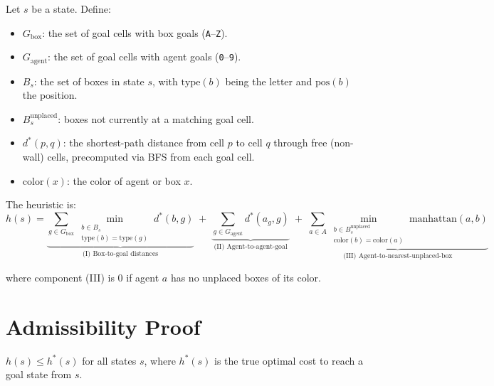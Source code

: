 \documentclass[11pt, a4paper]{article}
\begin{document}
\begin{definitionbox}
Let $s$ be a state. Define:
\begin{itemize}[leftmargin=1.5em]
    \item $G_{\text{box}}$: the set of goal cells with box goals (\texttt{A}--\texttt{Z}).
    \item $G_{\text{agent}}$: the set of goal cells with agent goals (\texttt{0}--\texttt{9}).
    \item $B_s$: the set of boxes in state $s$, with $\text{type}(b)$ being the letter and $\text{pos}(b)$ the position.
    \item $B_s^{\text{unplaced}}$: boxes not currently at a matching goal cell.
    \item $d^*(p, q)$: the shortest-path distance from cell $p$ to cell $q$ through free (non-wall) cells, precomputed via BFS from each goal cell.
    \item $\text{color}(x)$: the color of agent or box $x$.
\end{itemize}

\vspace{0.5em}
The heuristic is:
\[
\boxed{
    h(s) = \underbrace{\sum_{g \in G_{\text{box}}} \min_{\substack{b \in B_s \\ \text{type}(b) = \text{type}(g)}} d^*(b, g)}_{\text{(I) Box-to-goal distances}}
    \;+\; \underbrace{\sum_{g \in G_{\text{agent}}} d^*(a_g, g)}_{\text{(II) Agent-to-agent-goal}}
    \;+\; \underbrace{\sum_{a \in A} \min_{\substack{b \in B_s^{\text{unplaced}} \\ \text{color}(b) = \text{color}(a)}} \text{manhattan}(a, b)}_{\text{(III) Agent-to-nearest-unplaced-box}}
}
\]

\vspace{0.3em}
where component (III) is $0$ if agent $a$ has no unplaced boxes of its color.
\end{definitionbox}

\section{Admissibility Proof}

\begin{propertybox}
$h(s) \leq h^*(s)$ for all states $s$, where $h^*(s)$ is the true optimal cost to reach a goal state from $s$.
\end{propertybox}
\end{document}
